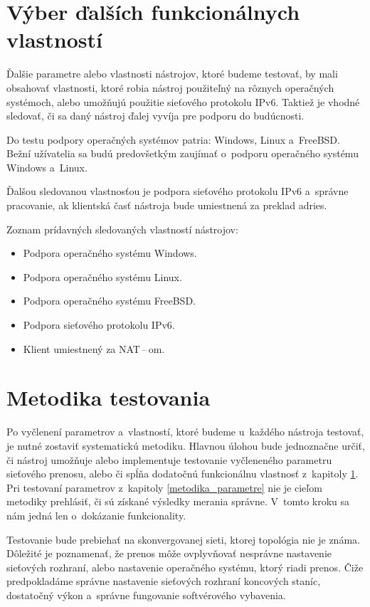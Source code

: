 \section{Výber ďalších funkcionálnych vlastností} \label{metodika_vlastnosti}
Ďalšie parametre alebo vlastnosti nástrojov, ktoré budeme testovať, by mali obsahovať
vlastnosti, ktoré robia nástroj použiteľný na rôznych operačných systémoch,
alebo umožňujú použitie sieťového protokolu IPv6.
Taktiež je vhodné sledovať, či sa daný
nástroj ďalej vyvíja pre podporu do budúcnosti.  

Do testu podpory operačných systémov patria: Windows, Linux
a~FreeBSD. Bežní užívatelia sa budú predovšetkým zaujímať o~podporu
operačného systému Windows a~Linux.

Ďalšou sledovanou vlastnosťou je podpora sieťového
protokolu IPv6 a~správne pracovanie, ak klientská časť nástroja bude
umiestnená za preklad adries.

\noindent Zoznam prídavných sledovaných vlastností nástrojov:
\begin{itemize}
    \item Podpora operačného systému Windows.
    \item Podpora operačného systému Linux.
    \item Podpora operačného systému FreeBSD.
    \item Podpora sieťového protokolu IPv6.
    \item Klient umiestnený za NAT\,--\,om.
\end{itemize}

\section{Metodika testovania}
Po vyčlenení parametrov a~vlastností, ktoré budeme u~každého nástroja 
testovať, je nutné zostaviť systematickú metodiku. Hlavnou úlohou bude
jednoznačne určiť, či nástroj umožňuje alebo implementuje testovanie vyčleneného
parametru sieťového prenosu, alebo či spĺňa dodatočnú funkcionálnu
vlastnosť z~kapitoly \ref{metodika_vlastnosti}. 
Pri testovaní parametrov z~kapitoly \ref{metodika_parametre} nie je 
cieľom metodiky prehlásiť, či sú získané výsledky merania správne.
V~tomto kroku sa nám jedná len o~dokázanie funkcionality.

Testovanie bude prebiehať na skonvergovanej sieti, ktorej topológia nie je 
známa. Dôležité je poznamenať, že prenos môže ovplyvňovať nesprávne
nastavenie sieťových rozhraní, alebo nastavenie operačného systému, ktorý
riadi prenos. Čiže predpokladáme správne nastavenie sieťových rozhraní
koncových staníc, dostatočný výkon a~správne fungovanie softvérového
vybavenia. 

